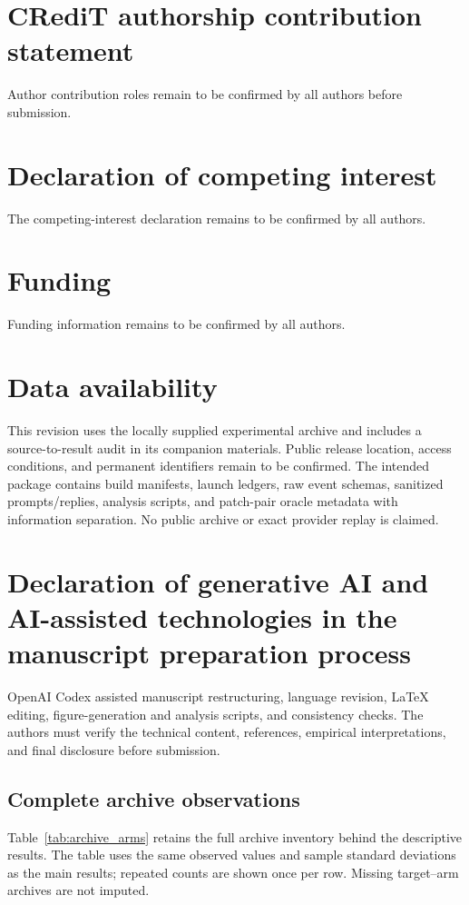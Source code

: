 \documentclass[final,5p,times,number]{elsarticle}
\begin{document}
\balance
\section*{CRediT authorship contribution statement}
Author contribution roles remain to be confirmed by all authors before submission.
\section*{Declaration of competing interest}
The competing-interest declaration remains to be confirmed by all authors.
\section*{Funding}
Funding information remains to be confirmed by all authors.
\section*{Data availability}
This revision uses the locally supplied experimental archive and includes a source-to-result audit in its companion materials. Public release location, access conditions, and permanent identifiers remain to be confirmed. The intended package contains build manifests, launch ledgers, raw event schemas, sanitized prompts/replies, analysis scripts, and patch-pair oracle metadata with information separation. No public archive or exact provider replay is claimed.
\section*{Declaration of generative AI and AI-assisted technologies in the manuscript preparation process}
OpenAI Codex assisted manuscript restructuring, language revision, LaTeX editing, figure-generation and analysis scripts, and consistency checks. The authors must verify the technical content, references, empirical interpretations, and final disclosure before submission.

\onecolumn
\nobalance
\begin{landscape}
\appendix
\setcounter{table}{0}
\section{Complete archive observations}
\label{sec:archive_appendix}
Table~\ref{tab:archive_arms} retains the full archive inventory behind the descriptive results. The table uses the same observed values and sample standard deviations as the main results; repeated counts are shown once per row. Missing target--arm archives are not imputed.

\end{landscape}
\twocolumn

\balance


\end{document}
